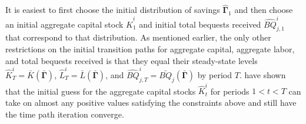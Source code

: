   It is easiest to first choose the initial distribution of savings $\bm{\hat{\Gamma}}_1$ and then choose an initial aggregate capital stock $\hat{K}_1^i$ and initial total bequests received $\hat{BQ}_{j,1}^i$ that correspond to that distribution. As mentioned earlier, the only other restrictions on the initial transition paths for aggregate capital, aggregate labor, and total bequests received is that they equal their steady-state levels $\hat{K}_T^i = \bar{K}\left(\bm{\bar{\Gamma}}\right)$, $\hat{L}_T^i = \bar{L}\left(\bm{\bar{\Gamma}}\right)$, and $\hat{BQ}_{j,T}^i = \bar{BQ}_j\left(\bm{\bar{\Gamma}}\right)$ by period $T$. \citet{EvansPhillips:2014} have shown that the initial guess for the aggregate capital stocks $\hat{K}_t^i$ for periods $1<t<T$ can take on almost any positive values satisfying the constraints above and still have the time path iteration converge.

